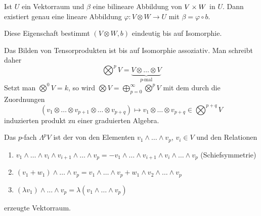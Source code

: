 \begin{emptythm}
Ist $U$ ein Vektorraum und $\beta$ eine bilineare Abbildung von $V \times W$ in $U$. Dann existiert genau eine lineare Abbildung $\varphi: V \otimes W \to U$ mit $\beta = \varphi \circ b$.
\begin{center}\end{center}
Diese Eigenschaft bestimmt $(V \otimes W, b)$ eindeutig bis auf Isomorphie.
\end{emptythm}

Das Bilden von Tensorprodukten ist bis auf Isomorphie assoziativ. Man schreibt daher
	\[ \bigotimes^p V = \underbrace{V \otimes \ldots \otimes V}_{p\text{-mal}} \]
Setzt man $\bigotimes^0 V = k$, so wird $\bigotimes V = \bigoplus_{p=0}^{\infty} \bigotimes^p V$ mit dem durch die Zuordnungen
	\[ (v_1 \otimes \ldots \otimes v_{p+1} \otimes \ldots \otimes v_{p+q}) \mapsto v_1 \otimes \ldots \otimes v_{p+q} \in \bigotimes^{p+q} V \]
induzierten produkt zu einer graduierten Algebra.

Das $p$-fach  $\Lambda^pV$ ist der von den Elementen $v_1 \wedge \ldots \wedge v_p$, $v_i \in V$ und den Relationen \begin{enumerate}[label=(\roman*),widest=iii]
\item
	$v_1 \wedge \ldots \wedge v_i \wedge v_{i+1} \wedge \ldots \wedge v_p = - v_1 \wedge \ldots \wedge v_{i+1} \wedge v_i \wedge \ldots \wedge v_p$ (Schiefsymmetrie)
\item
	$(v_1 + w_1) \wedge \ldots \wedge v_p = v_1 \wedge \ldots \wedge v_p + w_1 \wedge v_2 \wedge \ldots \wedge v_p$
\item
	$(\lambda v_1) \wedge \ldots \wedge v_p = \lambda (v_1 \wedge \ldots \wedge v_p)$
\end{enumerate}
erzeugte Vektorraum.

